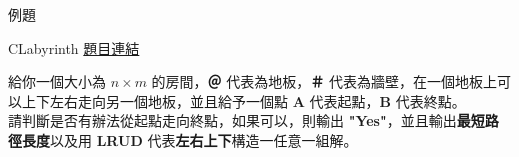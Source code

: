\documentclass[mathserif]{beamer}
\begin{document}
\begin{frame}{例題}
    \begin{block}{CLabyrinth}
        \href{https://cses.fi/problemset/task/1193}{題目連結}

        給你一個大小為 $n \times m$ 的房間，\textbf{＠} 代表為地板，\textbf{＃} 代表為牆壁，在一個地板上可以上下左右走向另一個地板，並且給予一個點 \textbf{A} 代表起點，\textbf{B} 代表終點。\\
        \vspace{1em}
        請判斷是否有辦法從起點走向終點，如果可以，則輸出 \textbf{"Yes"}，並且輸出\textbf{最短路徑長度}以及用 \textbf{LRUD} 代表\textbf{左右上下}構造一任意一組解。
    \end{block}
\end{frame}


            
\end{document}
